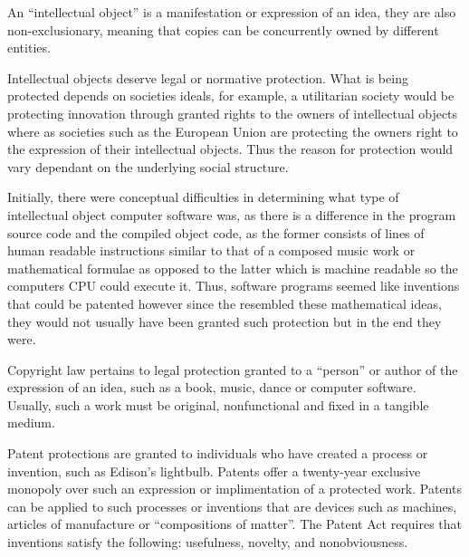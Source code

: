 

An ``intellectual object'' is a manifestation or expression of an idea, they are also non-exclusionary, meaning that copies can be concurrently owned by different entities.



Intellectual objects deserve legal or normative protection. What is being protected depends on societies ideals, for example, a utilitarian society would be protecting innovation through granted rights to the owners of intellectual objects where as societies such as the European Union are protecting the owners right to the expression of their intellectual objects. Thus the reason for protection would vary dependant on the underlying social structure.



Initially, there were conceptual difficulties in determining what type of intellectual object computer software was, as there is a difference in the program source code and the compiled object code, as the former consists of lines of human readable instructions similar to that of a composed music work or mathematical formulae as opposed to the latter which is machine readable so the computers CPU could execute it. Thus, software programs seemed like inventions that could be patented however since the resembled these mathematical ideas, they would not usually have been granted such protection but in the end they were.



Copyright law pertains to legal protection granted to a ``person'' or author of the expression of an idea, such as a book, music, dance or computer software. Usually, such a work must be original, nonfunctional and fixed in a tangible medium.

Patent protections are granted to individuals who have created a process or invention, such as Edison's lightbulb. Patents offer a twenty-year exclusive monopoly over such an expression or implimentation of a protected work. Patents can be applied to such processes or inventions that are devices such as machines, articles of manufacture or ``compositions of matter''. The Patent Act requires that inventions satisfy the following: usefulness, novelty, and nonobviousness.

